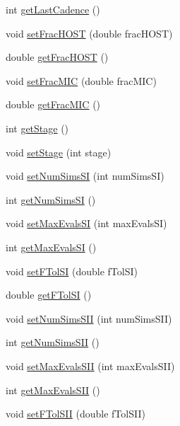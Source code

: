 \begin{DoxyCompactItemize}
int \hyperlink{class_kepler_obj_ad2c733e73ddd622f8c2b74b070ba9f51}{get\-Last\-Cadence} ()
\item 
void \hyperlink{class_kepler_obj_a7ac5a2d3bdaa7a41a39a238788f8a6fa}{set\-Frac\-H\-O\-S\-T} (double frac\-H\-O\-S\-T)
\item 
double \hyperlink{class_kepler_obj_a230eab3c510a51b2197cf6ec7e30fd75}{get\-Frac\-H\-O\-S\-T} ()
\item 
void \hyperlink{class_kepler_obj_a612da6fa87b8f97c4f161bc5f39fe9ea}{set\-Frac\-M\-I\-C} (double frac\-M\-I\-C)
\item 
double \hyperlink{class_kepler_obj_a0ff0576f717c68e5e4b9f0757c3f80f7}{get\-Frac\-M\-I\-C} ()
\item 
int \hyperlink{class_kepler_obj_a9dadabc2f3314221e358a3c056b22f21}{get\-Stage} ()
\item 
void \hyperlink{class_kepler_obj_afcd5f85bcd1f39d590d70e0dcdc1ee08}{set\-Stage} (int stage)
\item 
void \hyperlink{class_kepler_obj_ace628ec6c767aff9168497ec63984ccc}{set\-Num\-Sims\-S\-I} (int num\-Sims\-S\-I)
\item 
int \hyperlink{class_kepler_obj_ade4482c97b7fc9ea66ec8b94a289f881}{get\-Num\-Sims\-S\-I} ()
\item 
void \hyperlink{class_kepler_obj_a43d6d7205c8a92397558a97217511b62}{set\-Max\-Evals\-S\-I} (int max\-Evals\-S\-I)
\item 
int \hyperlink{class_kepler_obj_aa23b06e8009166f41be3885df24317d4}{get\-Max\-Evals\-S\-I} ()
\item 
void \hyperlink{class_kepler_obj_a3e6045761b050157a17fb578685bdd9a}{set\-F\-Tol\-S\-I} (double f\-Tol\-S\-I)
\item 
double \hyperlink{class_kepler_obj_a4fb09c27d3291bd40875d78cfdc2e80c}{get\-F\-Tol\-S\-I} ()
\item 
void \hyperlink{class_kepler_obj_a762cbe9392ac57bcb4fa64858826e1f1}{set\-Num\-Sims\-S\-I\-I} (int num\-Sims\-S\-I\-I)
\item 
int \hyperlink{class_kepler_obj_aa3cf9a27159e7e6a4035434c5e10d65b}{get\-Num\-Sims\-S\-I\-I} ()
\item 
void \hyperlink{class_kepler_obj_ab6eaf04d2a806c718a41c38a44af6190}{set\-Max\-Evals\-S\-I\-I} (int max\-Evals\-S\-I\-I)
\item 
int \hyperlink{class_kepler_obj_a5c3a7895c5a602b005bbb2042e1650e8}{get\-Max\-Evals\-S\-I\-I} ()
\item 
void \hyperlink{class_kepler_obj_a799a2b684a67435c404e6071af7b00f6}{set\-F\-Tol\-S\-I\-I} (double f\-Tol\-S\-I\-I)

\end{DoxyCompactItemize}
